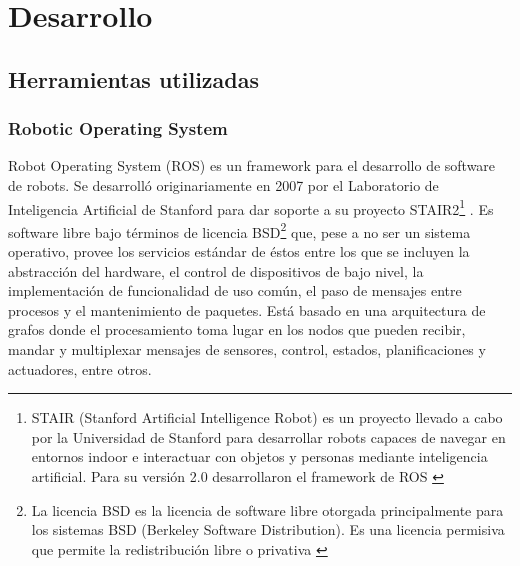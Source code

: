 

\usepackage[
backend=biber,
style=numeric,
sorting=none,
dateabbrev=false,
citestyle=numeric
]{biblatex}






\pagestyle{fancy}

\maketitle

\tableofcontents



\part{Desarrollo}

\chapter{Herramientas utilizadas}

\section{Robotic Operating System}

Robot Operating System (ROS) es un framework para el desarrollo de software de robots. Se desarrolló originariamente en 2007 por el Laboratorio de Inteligencia Artificial de Stanford para dar soporte a su proyecto STAIR2\footnote{STAIR (Stanford Artificial Intelligence Robot) es un proyecto llevado a cabo por la Universidad de Stanford para desarrollar robots capaces de navegar en entornos indoor e interactuar con objetos y personas mediante inteligencia artificial. Para su versión 2.0 desarrollaron el framework de ROS \cite{stair}} \cite{stair_paper}. Es software libre bajo términos de licencia BSD\footnote{La licencia BSD es la licencia de software libre otorgada principalmente para los sistemas BSD (Berkeley Software Distribution). Es una licencia permisiva que permite la redistribución libre o privativa \cite{licencia}} que, pese a no ser un sistema operativo, provee los servicios estándar de éstos entre los que se incluyen la abstracción del hardware, el control de dispositivos de bajo nivel, la implementación de funcionalidad de uso común, el paso de mensajes entre procesos y el mantenimiento de paquetes. Está basado en una arquitectura de grafos donde el procesamiento toma lugar en los nodos que pueden recibir, mandar y multiplexar mensajes de sensores, control, estados, planificaciones y actuadores, entre otros.\\


